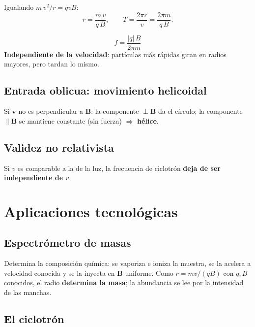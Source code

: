 \documentclass[12pt,a4paper]{article}
\begin{document}
Igualando $m\,v^2/r = qvB$:
\[
\boxed{r = \frac{m\,v}{q\,B}}, \qquad
T = \frac{2\pi r}{v} = \boxed{\frac{2\pi m}{q\,B}}.
\]

\begin{keybox}
  \[
  \boxed{f = \frac{|q|\,B}{2\pi m}}
  \]
  \textbf{Independiente de la velocidad}: partículas más rápidas giran en
  radios mayores, pero tardan lo mismo.
\end{keybox}

\subsection{Entrada oblicua: movimiento helicoidal}

Si $\mathbf{v}$ no es perpendicular a $\mathbf{B}$: la componente
$\perp\mathbf{B}$ da el círculo; la componente $\parallel\mathbf{B}$ se
mantiene constante (sin fuerza) $\Rightarrow$ \textbf{hélice}.

\subsection{Validez no relativista}

\begin{warnbox}[Relativista]
  Si $v$ es comparable a la de la luz, la frecuencia de ciclotrón
  \textbf{deja de ser independiente de $v$}.
\end{warnbox}

\section{Aplicaciones tecnológicas}

\subsection{Espectrómetro de masas}

Determina la composición química: se vaporiza e ioniza la muestra, se la
acelera a velocidad conocida y se la inyecta en $\mathbf{B}$ uniforme.
Como $r = mv/(qB)$ con $q,B$ conocidos, el radio \textbf{determina la
masa}; la abundancia se lee por la intensidad de las manchas.

\subsection{El ciclotrón}
\end{document}
